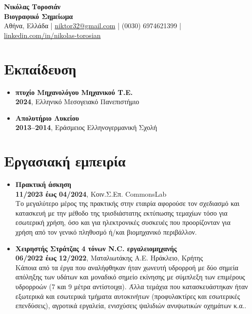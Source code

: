 \documentclass[a4paper,9pt]{extarticle}
\begin{document}
\newcommand{\en}[1]{\selectlanguage{english}\text{#1}\selectlanguage{greek}}
\pagestyle{empty}

\begin{center}
\textbf{\Large Νικόλας Τοροσιάν }\\[3pt] %
\textbf{Βιογραφικό Σημείωμα}\\[1pt] %
Αθήνα, Ελλάδα
 | \href{mailto:niktor32@gmail.com}{niktor32@gmail.com} | (0030) 6974621399 | \href{https://www.linkedin.com/in/nikolas-torosian-700235273/}{linkedin.com/in/nikolas-torosian} %
\end{center}


\section*{Εκπαίδευση}

\noindent
\begin{itemize}
  \item{\textbf{πτυχίο Μηχανολόγου Μηχανικού Τ.Ε.}} \\
        \textbf{2024}, Ελληνικό Μεσογειακό Πανεπιστήμιο \\
\noindent
  \item{\textbf{Απολυτήριο Λυκείου}} \\
        \textbf{2013--2014}, Εράσμειος Ελληνογερμανική Σχολή \\
\end{itemize}

\section*{Εργασιακή εμπειρία}
\noindent
\begin{itemize}
  \item{\textbf{Πρακτική άσκηση}}\\
        \textbf{11/2023 έως 04/2024}, Κοιν.Σ.Επ. CommonsLab \\
        Το μεγαλύτερο μέρος της πρακτικής στην εταιρία αφορούσε τον σχεδιασμό και κατασκευή με την μέθοδο της τρισδιάστατης εκτύπωσης τεμαχίων τόσο για εσωτερική χρήση, όσο και για ηλεκτρονικές συσκευές που προορίζονταν για χρήση από τον γενικό πληθυσμό ή/και βιομηχανικό περιβάλλον. \\
  \item{\textbf{Χειρηστής Στράτζας 4 τόνων N.C.  εργαλειομηχανής}} \\
        \textbf{06/2022 έως 12/2022}, Ματαλιωτάκης Α.Ε. Ηράκλειο, Κρήτης \\
        Κάποια από τα έργα που αναλήφθηκαν ήταν χωνευτή υδρορροή με δύο σημεία απόληξης των υδάτων και μοναδικό σημείο εκίνησης με σύμπλεξη των επιμέρους υδρορροών (7 και 9 μέτρα αντίστοιχα). Άλλα τεμάχια που κατασκευάστηκαν ήταν εξωτερικά και εσωτερικά τμήματα αυτοκινήτων (προφυλακτίρες και εσωτερικές επενδύσεις), αγροτικά εργαλεία, ενισχύσεις ψαλιδιών ανυψωτικών οχημάτων κ.α.. \\
\end{itemize}
\end{document}
